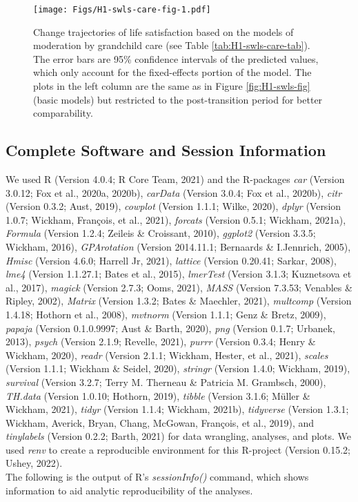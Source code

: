 \documentclass[
  english,
  man,floatsintext]{apa7}
\begin{document}
\begin{figure}
\centering
\texttt{[image: Figs/H1-swls-care-fig-1.pdf]}
\caption{\label{fig:H1-swls-care-fig}Change trajectories of life satisfaction based on the models of moderation by grandchild care (see Table \ref{tab:H1-swls-care-tab}). The error bars are 95\% confidence intervals of the predicted values, which only account for the fixed-effects portion of the model. The plots in the left column are the same as in Figure \ref{fig:H1-swls-fig} (basic models) but restricted to the post-transition period for better comparability.}
\end{figure}

\newpage

\hypertarget{complete-software-and-session-information}{%
\subsection{Complete Software and Session Information}\label{complete-software-and-session-information}}

We used R (Version 4.0.4; R Core Team, 2021) and the R-packages \emph{car} (Version 3.0.12; Fox et al., 2020a, 2020b), \emph{carData} (Version 3.0.4; Fox et al., 2020b), \emph{citr} (Version 0.3.2; Aust, 2019), \emph{cowplot} (Version 1.1.1; Wilke, 2020), \emph{dplyr} (Version 1.0.7; Wickham, François, et al., 2021), \emph{forcats} (Version 0.5.1; Wickham, 2021a), \emph{Formula} (Version 1.2.4; Zeileis \& Croissant, 2010), \emph{ggplot2} (Version 3.3.5; Wickham, 2016), \emph{GPArotation} (Version 2014.11.1; Bernaards \& I.Jennrich, 2005), \emph{Hmisc} (Version 4.6.0; Harrell Jr, 2021), \emph{lattice} (Version 0.20.41; Sarkar, 2008), \emph{lme4} (Version 1.1.27.1; Bates et al., 2015), \emph{lmerTest} (Version 3.1.3; Kuznetsova et al., 2017), \emph{magick} (Version 2.7.3; Ooms, 2021), \emph{MASS} (Version 7.3.53; Venables \& Ripley, 2002), \emph{Matrix} (Version 1.3.2; Bates \& Maechler, 2021), \emph{multcomp} (Version 1.4.18; Hothorn et al., 2008), \emph{mvtnorm} (Version 1.1.1; Genz \& Bretz, 2009), \emph{papaja} (Version 0.1.0.9997; Aust \& Barth, 2020), \emph{png} (Version 0.1.7; Urbanek, 2013), \emph{psych} (Version 2.1.9; Revelle, 2021), \emph{purrr} (Version 0.3.4; Henry \& Wickham, 2020), \emph{readr} (Version 2.1.1; Wickham, Hester, et al., 2021), \emph{scales} (Version 1.1.1; Wickham \& Seidel, 2020), \emph{stringr} (Version 1.4.0; Wickham, 2019), \emph{survival} (Version 3.2.7; Terry M. Therneau \& Patricia M. Grambsch, 2000), \emph{TH.data} (Version 1.0.10; Hothorn, 2019), \emph{tibble} (Version 3.1.6; Müller \& Wickham, 2021), \emph{tidyr} (Version 1.1.4; Wickham, 2021b), \emph{tidyverse} (Version 1.3.1; Wickham, Averick, Bryan, Chang, McGowan, François, et al., 2019), and \emph{tinylabels} (Version 0.2.2; Barth, 2021) for data wrangling, analyses, and plots. We used \emph{renv} to create a reproducible environment for this R-project (Version 0.15.2; Ushey, 2022).\\
The following is the output of R's \emph{sessionInfo()} command, which shows information to aid analytic reproducibility of the analyses.
\end{document}

